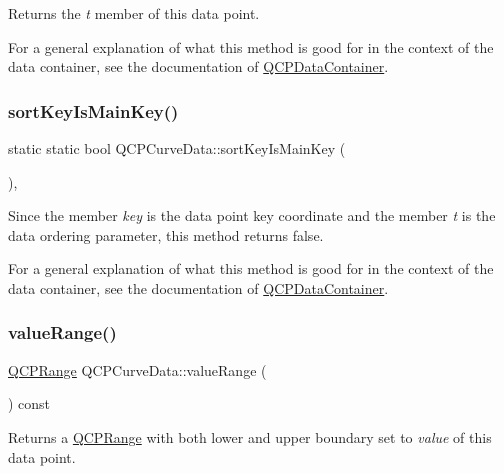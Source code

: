Returns the {\itshape t} member of this data point.

For a general explanation of what this method is good for in the context of the data container, see the documentation of \hyperlink{class_q_c_p_data_container}{Q\+C\+P\+Data\+Container}. \mbox{\label{class_q_c_p_curve_data_a1b78f228e31ca40a1e69add44537918c}} 
\subsubsection{\texorpdfstring{sort\+Key\+Is\+Main\+Key()}{sortKeyIsMainKey()}}
{\footnotesize\ttfamily static static bool Q\+C\+P\+Curve\+Data\+::sort\+Key\+Is\+Main\+Key (\begin{DoxyParamCaption}{ }\end{DoxyParamCaption})\hspace{0.3cm}{\ttfamily [inline]}, {\ttfamily [static]}}

Since the member {\itshape key} is the data point key coordinate and the member {\itshape t} is the data ordering parameter, this method returns false.

For a general explanation of what this method is good for in the context of the data container, see the documentation of \hyperlink{class_q_c_p_data_container}{Q\+C\+P\+Data\+Container}. \mbox{\label{class_q_c_p_curve_data_acf15deffd18d400651f8384a95dad9f8}} 
\subsubsection{\texorpdfstring{value\+Range()}{valueRange()}}
{\footnotesize\ttfamily \hyperlink{class_q_c_p_range}{Q\+C\+P\+Range} Q\+C\+P\+Curve\+Data\+::value\+Range (\begin{DoxyParamCaption}{ }\end{DoxyParamCaption}) const\hspace{0.3cm}{\ttfamily [inline]}}

Returns a \hyperlink{class_q_c_p_range}{Q\+C\+P\+Range} with both lower and upper boundary set to {\itshape value} of this data point.

